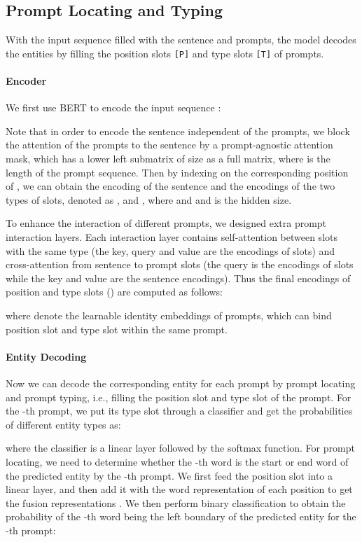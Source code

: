 \documentclass[11pt]{article}
\begin{document}
\subsection{Prompt Locating and Typing}
\label{3.3}

With the input sequence  filled with the sentence  and  prompts, the model decodes the entities by filling the position slots \texttt{[P]} and type slots \texttt{[T]} of  prompts.

\paragraph{Encoder}

We first use BERT \citep{devlin-etal-2019-bert} to encode the input sequence : 


\noindent Note that in order to encode the sentence  independent of the prompts, we block the attention of the prompts to the sentence by a prompt-agnostic attention mask, which has a lower left submatrix of size  as a full  matrix, where  is the length of the prompt sequence. Then by indexing on the corresponding position of , we can obtain the encoding of the sentence  and the encodings of the two types of slots, denoted as ,  and , where  and  and  is the hidden size.


To enhance the interaction of different prompts, we designed extra prompt interaction layers. Each interaction layer contains self-attention between slots with the same type (the key, query and value are the encodings of slots) and cross-attention from sentence to prompt slots (the query is the encodings of slots while the key and value are the sentence encodings). Thus the final encodings of position and type slots () are computed as follows:


\noindent where  denote the learnable identity embeddings of  prompts, which can bind position slot and type slot within the same prompt.



\paragraph{Entity Decoding}
Now we can decode the corresponding entity for each prompt by prompt locating and prompt typing, i.e., filling the position slot and type slot of the prompt. For the -th prompt, we put its type slot  through a classifier and get the probabilities of different entity types as:



\noindent where the classifier is a linear layer followed by the softmax function. For prompt locating, we need to determine whether the -th word is the start or end word of the predicted entity by the -th prompt. We first feed the position slot  into a linear layer, and then add it with the word representation  of each position to get the fusion representations . We then perform binary classification to obtain the probability of the -th word being the left boundary of the predicted entity for the -th prompt:
\end{document}
